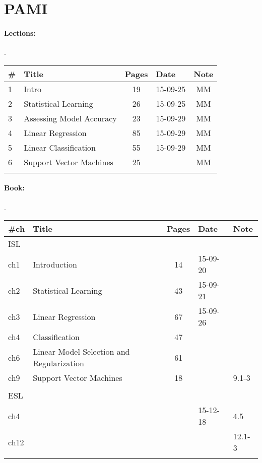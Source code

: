\documentclass[a4paper,12pt]{article} %
\begin{document}
\newpage
\section{PAMI}
\paragraph{Lections:} .\\
\begin{tabularx}{\textwidth}{|l|X|c|l|c|}
	\hline
	\# & Title & Pages & Date & Note \\
	\hline
	1 & Intro & 19 & 15-09-25 & MM \\
	\hline
	2 & Statistical Learning & 26 & 15-09-25 & MM \\
	\hline
	3 & Assessing Model Accuracy & 23 & 15-09-29 & MM \\
	\hline
	4 & Linear Regression & 85 & 15-09-29 & MM \\
	\hline
	5 & Linear Classification & 55 & 15-09-29 & MM \\
	\hline
	6 & Support Vector Machines & 25 &  & MM \\
	\hline
	&  &  &  &  \\
	\hline
\end{tabularx}

\paragraph{Book:} .\\
\begin{tabularx}{\textwidth}{|l|X|c|l|l|}
	\hline
	\#ch & Title & Pages & Date & Note \\
	\hline
	\multicolumn{5}{|l|}{ISL}\\
	\hline
	ch1 & Introduction & 14 & 15-09-20 &  \\
	\hline
	ch2 & Statistical Learning & 43 & 15-09-21 &  \\
	\hline
	ch3 & Linear Regression & 67 & 15-09-26 &  \\
	\hline
	ch4 & Classification & 47 &  &  \\
	\hline
	ch6 & Linear Model Selection and Regularization & 61 &  &  \\
	\hline
	ch9 & Support Vector Machines & 18 &  & 9.1-3 \\
	\hline
	&  &  &  &  \\
	\hline
	\multicolumn{5}{|l|}{ESL}\\
	\hline
	ch4 &  &  & 15-12-18 & 4.5 \\
	\hline
	ch12 &  &  &  & 12.1-3 \\
	\hline
	&  &  &  &  \\
	\hline
\end{tabularx}
\end{document}
